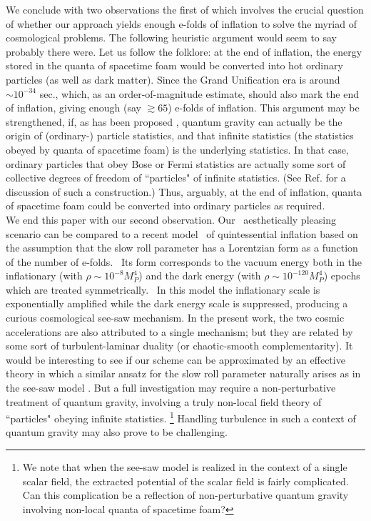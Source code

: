 \documentclass[12pt]{article}
\begin{document}
We conclude with two observations the first of which involves the crucial question of whether
our approach yields enough e-folds of inflation to solve the myriad of cosmological problems.
The following heuristic argument would seem to say probably there were.  
Let us follow the folklore: at the end of 
inflation, the energy stored in the quanta of spacetime foam would be converted into 
hot ordinary particles (as well as dark matter).  Since 
the Grand Unification era is around$\sim 10^{-34}$ sec., which, as an order-of-magnitude 
estimate, should 
also mark the end of inflation, giving enough (say $\gtrsim 65$) e-folds of inflation. 
This argument may be strengthened, if, as has been proposed \cite{Ho},
quantum gravity can actually be the origin of (ordinary-) particle statistics, 
and that 
infinite statistics (the statistics obeyed by quanta of spacetime foam) is the underlying 
statistics.  In that case, ordinary particles that obey Bose or Fermi statistics are actually 
some sort of collective degrees of freedom of ``particles" of infinite statistics.  (See Ref. 
\cite{Del} for a discussion of such a construction.)  Thus, arguably, at the end of inflation, 
quanta 
of spacetime foam could be converted into ordinary particles as required. \\

We end this paper with our second observation.  Our  aesthetically pleasing scenario can be 
compared to a recent model \cite{BG}
of quintessential inflation based on the assumption that the slow roll
parameter has a Lorentzian form as a function of the number of e-folds. 
Its form corresponds to the vacuum energy 
both in the inflationary (with $\rho \sim 10^{-8} M_P^4$) and the dark
energy (with $\rho \sim 10^{-120} M_P^4$)
epochs which are treated symmetrically.  In this model the inflationary
scale is exponentially amplified while the dark energy scale is suppressed,
producing a curious cosmological see-saw mechanism.  In the present work, 
the two cosmic accelerations are also attributed to a single mechanism;
but they are related by some sort of turbulent-laminar duality (or 
chaotic-smooth complementarity).  
It would be interesting to see if our scheme can be approximated by an effective 
theory in which a similar ansatz for the slow roll parameter naturally arises as in the 
see-saw model \cite{BG}.
But a full investigation may require a non-perturbative treatment of
quantum gravity, involving a truly non-local field theory of ``particles" obeying infinite 
statistics. \footnote{We note that
when the see-saw model is realized in the context of a single scalar field, the
extracted potential of the scalar field is fairly complicated.  Can this complication be 
a reflection of non-perturbative quantum gravity involving non-local quanta of spacetime 
foam?}
Handling turbulence in such a context of 
quantum gravity may also prove to be challenging.\\
\end{document}
